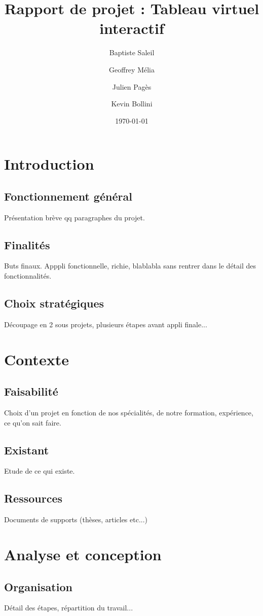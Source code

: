 \documentclass{article}
\title{Rapport de projet : Tableau virtuel interactif}
\author{Baptiste Saleil \and Geoffrey Mélia \and Julien Pagès \and Kevin Bollini}
\date{\today}
\begin{document}
	\maketitle
	\thispagestyle{empty}
	\newpage
	
	\tableofcontents
	\newpage
	
	\section{Introduction}
		\subsection{Fonctionnement général}
			Présentation brève qq paragraphes du projet.
		\subsection{Finalités}
			Buts finaux. Apppli fonctionnelle, richie, blablabla sans rentrer dans le détail des fonctionnalités.
		\subsection{Choix stratégiques}
			Découpage en 2 sous projets, plusieurs étapes avant appli finale...
	\section{Contexte}
		\subsection{Faisabilité}
			Choix d'un projet en fonction de nos spécialités, de notre formation, expérience, ce qu'on sait faire.
		\subsection{Existant}
			Etude de ce qui existe.
		\subsection{Ressources}
			Documents de supports (thèses, articles etc...)
	\section{Analyse et conception}
		\subsection{Organisation}
			Détail des étapes, répartition du travail...
\end{document}
